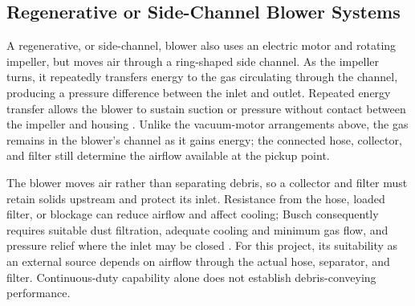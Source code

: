 \subsection{Regenerative or Side-Channel Blower Systems}
\label{sec:side-channel-blowers}
A regenerative, or side-channel, blower also uses an electric motor and rotating impeller, but moves air through a ring-shaped side channel. As the impeller turns, it repeatedly transfers energy to the gas circulating through the channel, producing a pressure difference between the inlet and outlet. Repeated energy transfer allows the blower to sustain suction or pressure without contact between the impeller and housing \citep{buschSideChannelTechnology}. Unlike the vacuum-motor arrangements above, the gas remains in the blower's channel as it gains energy; the connected hose, collector, and filter still determine the airflow available at the pickup point.

The blower moves air rather than separating debris, so a collector and filter must retain solids upstream and protect its inlet. Resistance from the hose, loaded filter, or blockage can reduce airflow and affect cooling; Busch consequently requires suitable dust filtration, adequate cooling and minimum gas flow, and pressure relief where the inlet may be closed \citep{buschSamosSIManual}. For this project, its suitability as an external source depends on airflow through the actual hose, separator, and filter. Continuous-duty capability alone does not establish debris-conveying performance.

